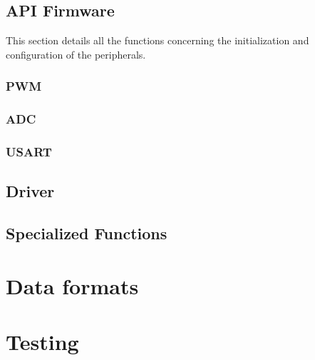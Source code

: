 \documentclass[11pt,a4paper]{report}
\begin{document}
\section{API Firmware} 

This section details all the functions concerning the initialization and configuration of the peripherals. 

\subsection{PWM} 
\subsection{ADC}
\subsection{USART} 

\section{Driver} 

\section{Specialized Functions} 

\chapter{Data formats}\thispagestyle{fancy}

\chapter{Testing}\thispagestyle{fancy} 
\end{document}
